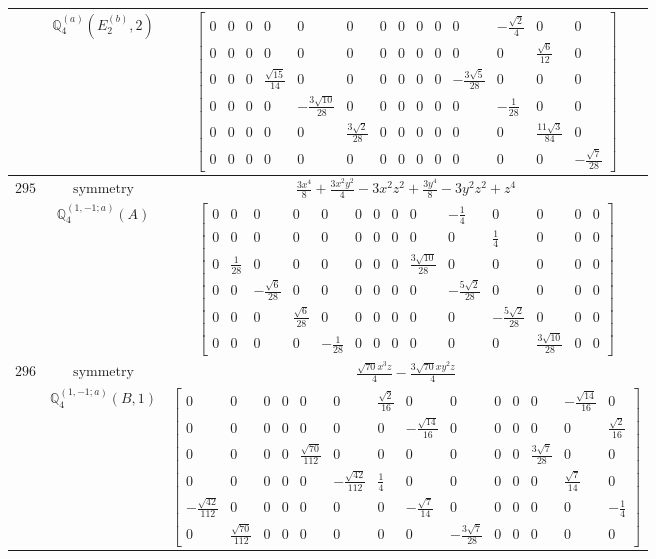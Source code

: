 \documentclass[fleqn,8pt,landscape]{jsarticle}
\begin{document}
\begin{longtable}{ccc}
$  $ & $ \mathbb{Q}_{4}^{(a)}(E_{2}^{(b)},2) $ & $ \begin{bmatrix} 0 & 0 & 0 & 0 & 0 & 0 & 0 & 0 & 0 & 0 & 0 & - \frac{\sqrt{2}}{4} & 0 & 0 \\ 0 & 0 & 0 & 0 & 0 & 0 & 0 & 0 & 0 & 0 & 0 & 0 & \frac{\sqrt{6}}{12} & 0 \\ 0 & 0 & 0 & \frac{\sqrt{15}}{14} & 0 & 0 & 0 & 0 & 0 & 0 & - \frac{3 \sqrt{5}}{28} & 0 & 0 & 0 \\ 0 & 0 & 0 & 0 & - \frac{3 \sqrt{10}}{28} & 0 & 0 & 0 & 0 & 0 & 0 & - \frac{1}{28} & 0 & 0 \\ 0 & 0 & 0 & 0 & 0 & \frac{3 \sqrt{2}}{28} & 0 & 0 & 0 & 0 & 0 & 0 & \frac{11 \sqrt{3}}{84} & 0 \\ 0 & 0 & 0 & 0 & 0 & 0 & 0 & 0 & 0 & 0 & 0 & 0 & 0 & - \frac{\sqrt{7}}{28} \end{bmatrix} $ \\ \hline
$ 295 $ & $ \text{symmetry} $ & $ \frac{3 x^{4}}{8} + \frac{3 x^{2} y^{2}}{4} - 3 x^{2} z^{2} + \frac{3 y^{4}}{8} - 3 y^{2} z^{2} + z^{4} $ \\
$  $ & $ \mathbb{Q}_{4}^{(1,-1;a)}(A) $ & $ \begin{bmatrix} 0 & 0 & 0 & 0 & 0 & 0 & 0 & 0 & 0 & - \frac{1}{4} & 0 & 0 & 0 & 0 \\ 0 & 0 & 0 & 0 & 0 & 0 & 0 & 0 & 0 & 0 & \frac{1}{4} & 0 & 0 & 0 \\ 0 & \frac{1}{28} & 0 & 0 & 0 & 0 & 0 & 0 & \frac{3 \sqrt{10}}{28} & 0 & 0 & 0 & 0 & 0 \\ 0 & 0 & - \frac{\sqrt{6}}{28} & 0 & 0 & 0 & 0 & 0 & 0 & - \frac{5 \sqrt{2}}{28} & 0 & 0 & 0 & 0 \\ 0 & 0 & 0 & \frac{\sqrt{6}}{28} & 0 & 0 & 0 & 0 & 0 & 0 & - \frac{5 \sqrt{2}}{28} & 0 & 0 & 0 \\ 0 & 0 & 0 & 0 & - \frac{1}{28} & 0 & 0 & 0 & 0 & 0 & 0 & \frac{3 \sqrt{10}}{28} & 0 & 0 \end{bmatrix} $ \\ \hline
$ 296 $ & $ \text{symmetry} $ & $ \frac{\sqrt{70} x^{3} z}{4} - \frac{3 \sqrt{70} x y^{2} z}{4} $ \\
$  $ & $ \mathbb{Q}_{4}^{(1,-1;a)}(B,1) $ & $ \begin{bmatrix} 0 & 0 & 0 & 0 & 0 & 0 & \frac{\sqrt{2}}{16} & 0 & 0 & 0 & 0 & 0 & - \frac{\sqrt{14}}{16} & 0 \\ 0 & 0 & 0 & 0 & 0 & 0 & 0 & - \frac{\sqrt{14}}{16} & 0 & 0 & 0 & 0 & 0 & \frac{\sqrt{2}}{16} \\ 0 & 0 & 0 & 0 & \frac{\sqrt{70}}{112} & 0 & 0 & 0 & 0 & 0 & 0 & \frac{3 \sqrt{7}}{28} & 0 & 0 \\ 0 & 0 & 0 & 0 & 0 & - \frac{\sqrt{42}}{112} & \frac{1}{4} & 0 & 0 & 0 & 0 & 0 & \frac{\sqrt{7}}{14} & 0 \\ - \frac{\sqrt{42}}{112} & 0 & 0 & 0 & 0 & 0 & 0 & - \frac{\sqrt{7}}{14} & 0 & 0 & 0 & 0 & 0 & - \frac{1}{4} \\ 0 & \frac{\sqrt{70}}{112} & 0 & 0 & 0 & 0 & 0 & 0 & - \frac{3 \sqrt{7}}{28} & 0 & 0 & 0 & 0 & 0 \end{bmatrix} $ \\ \hline

\end{longtable}
\end{document}
